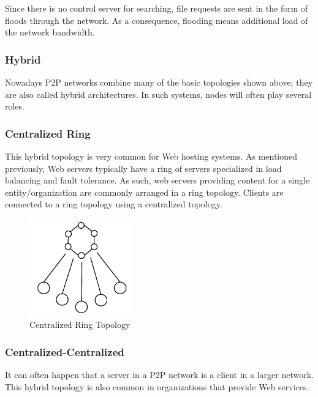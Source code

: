 Since there is no control server for searching, file requests are sent in the
form of floods through the network. As a consequence, flooding means additional
load of the network bandwidth.

\subsubsection{Hybrid}

Nowadays P2P networks combine many of the basic topologies shown above; they
are also called hybrid architectures. In such systems, nodes will often play
several roles.

\subsubsection{Centralized Ring}

This hybrid topology is very common for Web hosting systems. As mentioned
previously, Web servers typically have a ring of servers specialized in load
balancing and fault tolerance. As such, web servers providing content for a
single entity/organization are commonly arranged in a ring topology.  Clients
are connected to a ring topology using a centralized topology.

\begin{figure}
  \centering
  \includegraphics[width=0.4\textwidth]{src/img/p2p-systems/centralized-ring}
  \caption{Centralized Ring Topology}
  \label{fig:p2p-systems:centralized-ring}
\end{figure}

\subsubsection{Centralized-Centralized}

It can often happen that a server in a P2P network is a client in a larger
network. This hybrid topology is also common in organizations that provide
Web services.

